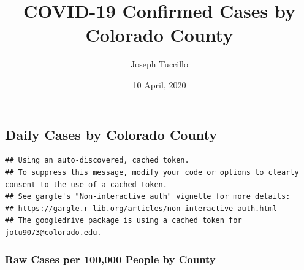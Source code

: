 \documentclass[]{article}
\title{COVID-19 Confirmed Cases by Colorado County}
\author{Joseph Tuccillo}
\date{10 April, 2020}
\newenvironment{Shaded}{\begin{snugshade}}{\end{snugshade}}
\newcommand{\CommentTok}[1]{\textcolor[rgb]{0.56,0.35,0.01}{\textit{#1}}}
\newcommand{\DataTypeTok}[1]{\textcolor[rgb]{0.13,0.29,0.53}{#1}}
\newcommand{\KeywordTok}[1]{\textcolor[rgb]{0.13,0.29,0.53}{\textbf{#1}}}
\newcommand{\NormalTok}[1]{#1}
\newcommand{\OperatorTok}[1]{\textcolor[rgb]{0.81,0.36,0.00}{\textbf{#1}}}
\newcommand{\OtherTok}[1]{\textcolor[rgb]{0.56,0.35,0.01}{#1}}
\newcommand{\StringTok}[1]{\textcolor[rgb]{0.31,0.60,0.02}{#1}}
\begin{document}
\maketitle

\begin{Shaded}
\end{Shaded}

\hypertarget{daily-cases-by-colorado-county}{%
\subsection{Daily Cases by Colorado
County}\label{daily-cases-by-colorado-county}}

\begin{verbatim}
## Using an auto-discovered, cached token.
## To suppress this message, modify your code or options to clearly consent to the use of a cached token.
## See gargle's "Non-interactive auth" vignette for more details:
## https://gargle.r-lib.org/articles/non-interactive-auth.html
## The googledrive package is using a cached token for jotu9073@colorado.edu.
\end{verbatim}

\hypertarget{raw-cases-per-100000-people-by-county}{%
\subsubsection{Raw Cases per 100,000 People by
County}\label{raw-cases-per-100000-people-by-county}}
\end{document}
